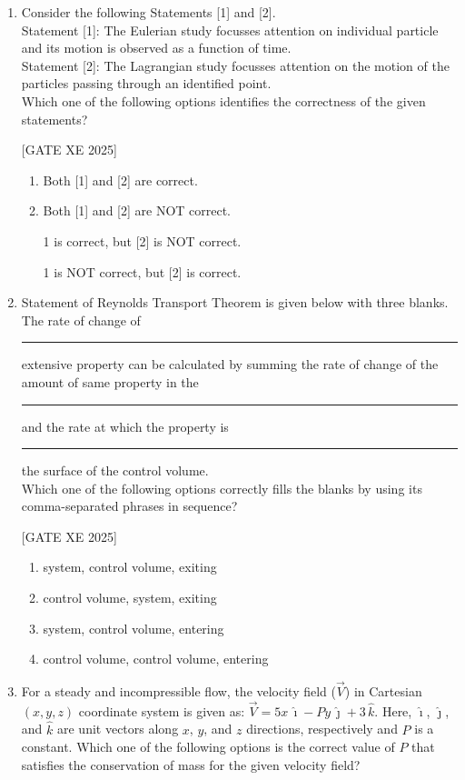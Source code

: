\documentclass[journal,12pt,onecolumn]{IEEEtran}
\theoremstyle{remark}
\begin{document}
\begin{enumerate}
\item Consider the following Statements [1] and [2]. \\
Statement [1]: The Eulerian study focusses attention on individual particle and its motion is observed as a function of time. \\
Statement [2]: The Lagrangian study focusses attention on the motion of the particles passing through an identified point. \\
Which one of the following options identifies the correctness of the given statements? \label{q:24}

\hfill[GATE XE 2025]

\begin{multicols}{2}
\begin{enumerate}
\item Both [1] and [2] are correct.
\item Both [1] and [2] are NOT correct.
\item [1] is correct, but [2] is NOT correct.
\item [1] is NOT correct, but [2] is correct.
\end{enumerate}
\end{multicols}


\item Statement of Reynolds Transport Theorem is given below with three blanks. \\
The rate of change of \rule{3cm}{0.15mm} extensive property can be calculated by summing the rate of change of the amount of same property in the \rule{3cm}{0.15mm} and the rate at which the property is \rule{3cm}{0.15mm} the surface of the control volume. \\
Which one of the following options correctly fills the blanks by using its comma-separated phrases in sequence? \label{q:25}

\hfill[GATE XE 2025]

\begin{multicols}{2}
\begin{enumerate}
\item system, control volume, exiting
\item control volume, system, exiting
\item system, control volume, entering
\item control volume, control volume, entering
\end{enumerate}
\end{multicols}


\item For a steady and incompressible flow, the velocity field ($\vec{V}$) in Cartesian $(x,y,z)$ coordinate system is given as: $\vec{V}=5x\,\hat{\imath}-Py\,\hat{\jmath}+3\,\hat{k}$. Here, $\hat{\imath}$, $\hat{\jmath}$, and $\hat{k}$ are unit vectors along $x$, $y$, and $z$ directions, respectively and $P$ is a constant. Which one of the following options is the correct value of $P$ that satisfies the conservation of mass for the given velocity field? \label{q:26}


\end{enumerate}
\end{document}
